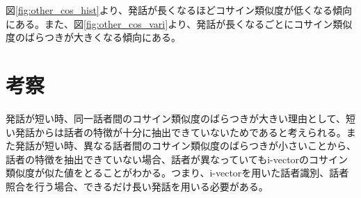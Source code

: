 図\ref{fig:other_cos_hist}より、発話が長くなるほどコサイン類似度が低くなる傾向にある。また、図\ref{fig:other_cos_vari}より、発話が長くなるごとにコサイン類似度のばらつきが大きくなる傾向にある。\par

\section{考察}
発話が短い時、同一話者間のコサイン類似度のばらつきが大きい理由として、短い発話からは話者の特徴が十分に抽出できていないためであると考えられる。また発話が短い時、異なる話者間のコサイン類似度のばらつきが小さいことから、話者の特徴を抽出できていない場合、話者が異なっていてもi-vectorのコサイン類似度が似た値をとることがわかる。つまり、i-vectorを用いた話者識別、話者照合を行う場合、できるだけ長い発話を用いる必要がある。
